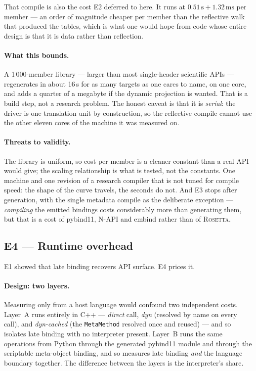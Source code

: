 \documentclass[11pt,a4paper]{article}
\newcommand{\rosetta}{\textsc{Rosetta}}
\newcommand{\code}[1]{\texttt{\small #1}}
\begin{document}
That compile is also the cost E2 deferred to here. It runs at
$0.51\,\text{s} + 1.32\,\text{ms}$ per member --- an order of magnitude cheaper
per member than the reflective walk that produced the tables, which is what
one would hope from code whose entire design is that it is data rather than
reflection.

\paragraph{What this bounds.} A 1\,000-member library --- larger than most
single-header scientific APIs --- regenerates in about 16\,s for as many targets
as one cares to name, on one core, and adds a quarter of a megabyte if the
dynamic projection is wanted. That is a build step, not a research problem. The
honest caveat is that it is \emph{serial}: the driver is one translation unit by
construction, so the reflective compile cannot use the other eleven cores of the
machine it was measured on.

\paragraph{Threats to validity.} The library is uniform, so cost per member is a
cleaner constant than a real API would give; the scaling relationship is what is
tested, not the constants. One machine and one revision of a research compiler
that is not tuned for compile speed: the shape of the curve travels, the seconds
do not. And E3 stops after generation, with the single metadata compile as the
deliberate exception --- \emph{compiling} the emitted bindings costs
considerably more than generating them, but that is a cost of pybind11, N-API
and embind rather than of \rosetta.

\subsection{E4 --- Runtime overhead}
\label{sec:e4}

E1 showed that late binding recovers API surface. E4 prices it.

\paragraph{Design: two layers.} Measuring only from a host language would
confound two independent costs. Layer~A runs entirely in C++ --- \emph{direct}
call, \emph{dyn} (resolved by name on every call), and \emph{dyn-cached} (the
\code{MetaMethod} resolved once and reused) --- and so isolates late binding
with no interpreter present. Layer~B runs the same operations from Python
through the generated pybind11 module and through the scriptable meta-object
binding, and so measures late binding \emph{and} the language boundary together.
The difference between the layers is the interpreter's share.
\end{document}
